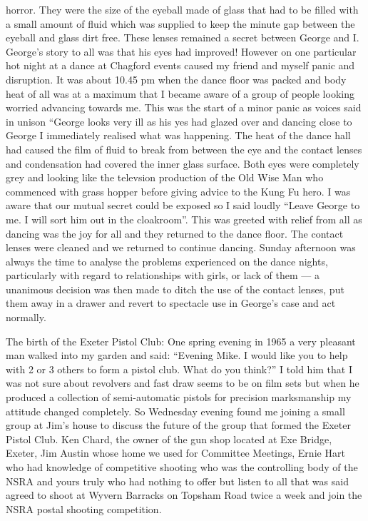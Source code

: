 horror. They were the size of the eyeball made of glass that had to be filled
with a small amount of fluid which was supplied to keep the minute gap between
the eyeball and glass dirt free. These lenses remained a secret between George
and I. George's story to all was that his eyes had improved! However on one
particular hot night at a dance at Chagford events caused my friend and myself
panic and disruption. It was about 10.45 pm when the dance floor was packed
and body heat of all was at a maximum that I became aware of a group of people
looking worried advancing towards me. This was the start of a minor panic as
voices said in unison ``George looks very ill as his yes had glazed over and
dancing close to George I immediately realised what was happening. The heat of
the dance hall had caused the film of fluid to break from between the eye and
the contact lenses and condensation had covered the inner glass surface. Both
eyes were completely grey and looking like the televsion production of the Old
Wise Man who commenced with         grass hopper before giving advice
to the Kung Fu hero. I was aware that our mutual secret could be exposed so I
said loudly ``Leave George to me. I will sort him out in the cloakroom''. This
was greeted with relief from all as dancing was the joy for all and they
returned to the dance floor. The contact lenses were cleaned and we returned to
continue dancing. Sunday afternoon was always the time to analyse the problems
experienced on the dance nights, particularly with regard to relationships with
girls, or lack of them --- a unanimous decision was then made to ditch the use
of the contact lenses, put them away in a drawer and revert to spectacle use in
George's case and act normally.








The birth of the Exeter Pistol Club: One spring evening in 1965 a very pleasant
man walked into my garden and said: ``Evening Mike. I would like you to help
with 2 or 3 others to form a pistol club. What do you think?'' I told him
that I was not sure about revolvers and fast draw seems to be on film sets but
when he produced a collection of semi-automatic pistols for precision
marksmanship my attitude changed completely. So Wednesday evening found me
joining a small group at Jim's house to discuss the future of the group that
formed the Exeter Pistol Club. Ken Chard, the owner of the gun shop located at
Exe Bridge, Exeter, Jim Austin whose home we used for Committee Meetings, Ernie
Hart who had knowledge of competitive shooting who was the controlling body of
the NSRA and yours truly who had nothing to offer but listen to all that was
said agreed to shoot at Wyvern Barracks on Topsham Road twice a week and join
the NSRA postal shooting competition.

